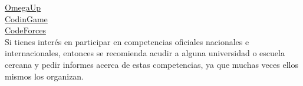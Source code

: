 \documentclass{article}
\begin{document}
\href{https://omegaup.com/}{OmegaUp} \\

\href{https://www.codingame.com/start}{CodinGame} \\

\href{https://codeforces.com/}{CodeForces} \\

Si tienes interés en participar en competencias oficiales nacionales e internacionales, entonces se recomienda acudir a alguna universidad o escuela cercana y pedir informes acerca de estas competencias, ya que muchas veces ellos mismos los organizan.
\end{document}

